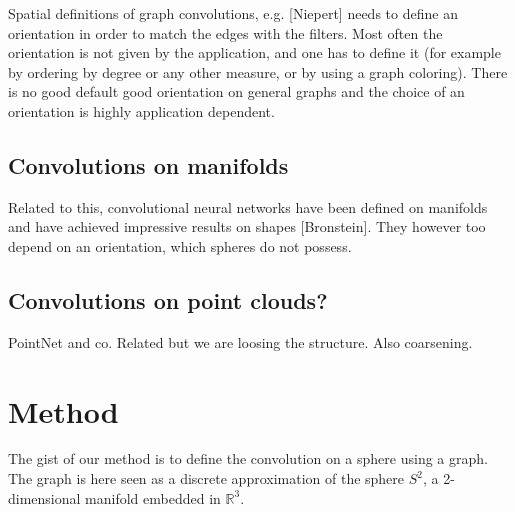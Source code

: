 \documentclass[final,twocolumn,3p,times,authoryear]{elsarticle}
\newcommand{\todo}[1]{{\color[rgb]{.6,.1,.6}{#1}}}
\newcommand{\1}{\b{1}}              %
\newcommand{\0}{\b{0}}              %
\begin{document}
Spatial definitions of graph convolutions, e.g. [Niepert] needs to define an orientation in order to match the edges with the filters. Most often the orientation is not given by the application, and one has to define it (for example by ordering by degree or any other measure, or by using a graph coloring). There is no good default good orientation on general graphs and the choice of an orientation is highly application dependent.


\todo{Maybe we just describe convolutions on sphere and graph, i.e: do we really need this two subsections? Maybe simply merge them?}
\subsection{Convolutions on manifolds}


Related to this, convolutional neural networks have been defined on manifolds and have achieved impressive results on shapes [Bronstein]. They however too depend on an orientation, which spheres do not possess.

\subsection{Convolutions on point clouds?}


PointNet and co. Related but we are loosing the structure. Also coarsening.

\section{Method}
\label{sec:method}

The gist of our method is to define the convolution on a sphere using a graph.
The graph is here seen as a discrete approximation of the sphere $S^2$, a
2-dimensional manifold embedded in $\mathbb{R}^3$.
\end{document}
